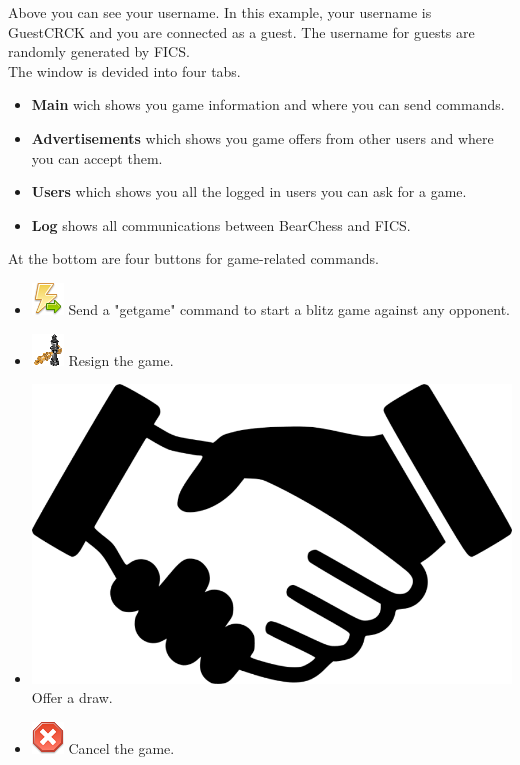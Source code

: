 \documentclass[11pt,a4paper]{article}
\begin{document}
Above you can see your username. In this example, your username is GuestCRCK and you are connected as a guest. The username for guests are randomly generated by FICS.\\
The window is devided into four tabs. 
\begin{itemize}
	\item \textbf{Main} wich shows you game information and where you can send commands.
	\item \textbf{Advertisements} which shows you game offers from other users and where you can accept them.
	\item \textbf{Users} which shows you all the logged in users you can ask for a game.
	\item \textbf{Log} shows all communications between BearChess and FICS.
\end{itemize}
At the bottom are four buttons for game-related commands.

\begin{itemize}
	\item \includegraphics[scale=0.5]{lightning_go.png} Send a "getgame" command to start a blitz game against any opponent.
	\item \includegraphics[scale=0.5]{6-2-chess-png.png} Resign the game.
	\item \includegraphics[scale=0.02]{handshake.png} Offer a draw.
	\item \includegraphics[scale=0.5]{cancel.png} Cancel the game.
\end{itemize}
\end{document}

